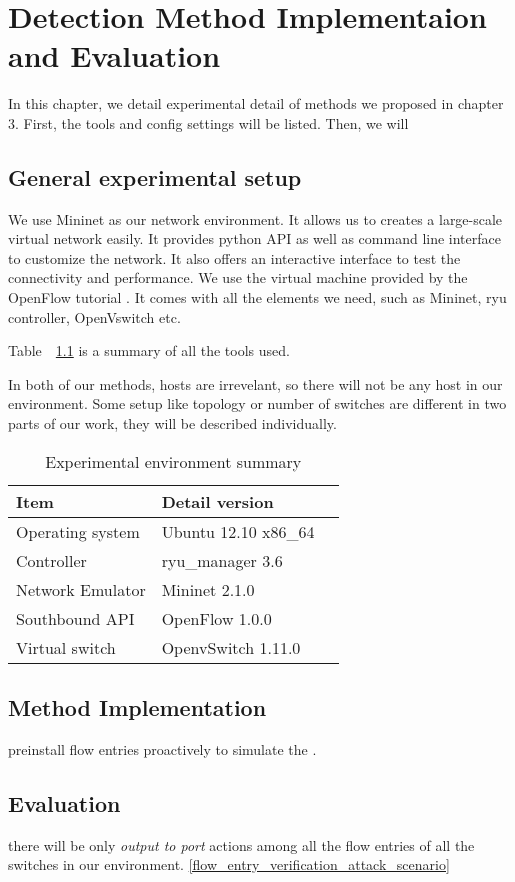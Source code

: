 \chapter{Detection Method Implementaion and Evaluation}
In this chapter, we detail experimental detail of methods we proposed in chapter 3. First, the tools and config settings will be listed. Then, we will 

\section{General experimental setup}
We use Mininet as our network environment. It allows us to creates a large-scale virtual network easily. 
It provides python API as well as command line interface to customize the network. It also offers an interactive interface to test the connectivity and performance. We use the virtual machine provided by the OpenFlow tutorial \cite{OFT}. It comes with all the elements we need, such as Mininet, ryu controller, OpenVswitch etc.

Table~~\ref{table:Experiment_table} is a summary of all the tools used. 

In both of our methods, hosts are irrevelant, so there will not be any host in our environment. Some setup like topology or number of switches are different in two parts of our work, they will be described individually.

\begin{table}[H]
\centering
\caption{Experimental environment summary}
\begin{tabular}{|l|p{4cm}|p{4.5cm}}
\hline Item & Detail version \\
\hline Operating system & Ubuntu 12.10 x86\_64 \\
\hline Controller & ryu\_manager 3.6 \\
\hline Network Emulator & Mininet 2.1.0\\
\hline Southbound API & OpenFlow 1.0.0 \\
\hline Virtual switch & OpenvSwitch 1.11.0 \\
\hline 
\end{tabular}
\label{table:Experiment_table}
\end{table}


\section{Method Implementation}
preinstall flow entries proactively to simulate the . 
\subsection{}



\section{Evaluation}


there will be only \textit{output to port} actions among all the flow entries of all the switches in our environment. \ref{flow_entry_verification_attack_scenario} 